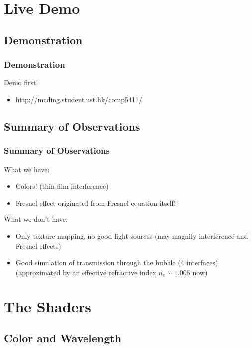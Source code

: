\documentclass{beamer}
\begin{document}
\section{Live Demo}

\subsection{Demonstration}

\begin{frame}
	\frametitle{Demonstration}
	Demo first!
	\begin{itemize}
		\item \url{http://mcding.student.ust.hk/comp5411/}
	\end{itemize}
\end{frame}


\subsection{Summary of Observations}

\begin{frame}
	\frametitle{Summary of Observations}
	What we have:
	\begin{itemize}
		\item Colors! (thin film interference)
		\item Fresnel effect originated from Fresnel equation itself!
	\end{itemize}
	What we don't have:
	\begin{itemize}
		\item Only texture mapping, no good light sources (may magnify interference and Fresnel effects)
		\item Good simulation of transmission through the bubble (4 interfaces) (approximated by an effective refractive index $ n_e \sim 1.005 $ now)
	\end{itemize}
\end{frame}

\section{The Shaders}

\subsection{Color and Wavelength}
\end{document}
